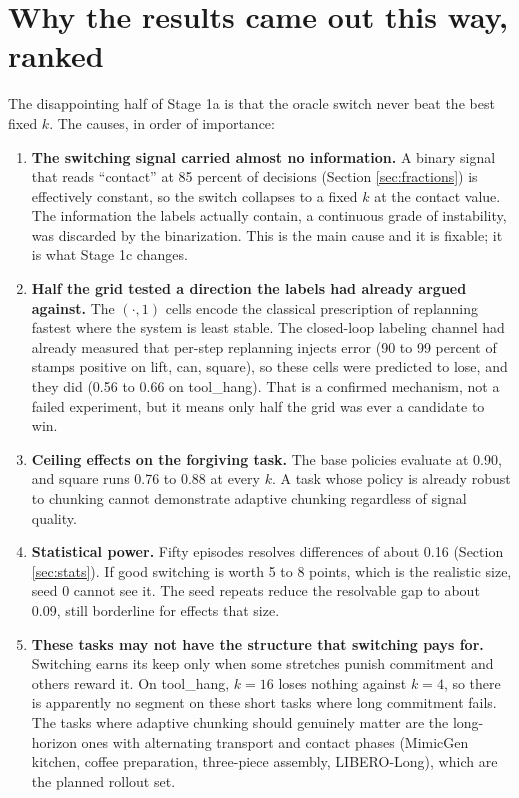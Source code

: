 \documentclass[11pt]{article}
\begin{document}
\section{Why the results came out this way, ranked}
\label{sec:why}

The disappointing half of Stage 1a is that the oracle switch never beat the best
fixed $k$. The causes, in order of importance:

\begin{enumerate}[leftmargin=1.6em]
\item \textbf{The switching signal carried almost no information.} A binary signal
that reads ``contact'' at 85 percent of decisions (Section \ref{sec:fractions}) is
effectively constant, so the switch collapses to a fixed $k$ at the contact value.
The information the labels actually contain, a continuous grade of instability, was
discarded by the binarization. This is the main cause and it is fixable; it is
what Stage 1c changes.
\item \textbf{Half the grid tested a direction the labels had already argued
against.} The $(\cdot,1)$ cells encode the classical prescription of replanning
fastest where the system is least stable. The closed-loop labeling channel had
already measured that per-step replanning injects error (90 to 99 percent of
stamps positive on lift, can, square), so these cells were predicted to lose, and
they did (0.56 to 0.66 on tool\_hang). That is a confirmed mechanism, not a failed
experiment, but it means only half the grid was ever a candidate to win.
\item \textbf{Ceiling effects on the forgiving task.} The base policies evaluate
at 0.90, and square runs 0.76 to 0.88 at every $k$. A task whose policy is already
robust to chunking cannot demonstrate adaptive chunking regardless of signal
quality.
\item \textbf{Statistical power.} Fifty episodes resolves differences of about
0.16 (Section \ref{sec:stats}). If good switching is worth 5 to 8 points, which is
the realistic size, seed 0 cannot see it. The seed repeats reduce the resolvable
gap to about 0.09, still borderline for effects that size.
\item \textbf{These tasks may not have the structure that switching pays for.}
Switching earns its keep only when some stretches punish commitment and others
reward it. On tool\_hang, $k{=}16$ loses nothing against $k{=}4$, so there is
apparently no segment on these short tasks where long commitment fails. The tasks
where adaptive chunking should genuinely matter are the long-horizon ones with
alternating transport and contact phases (MimicGen kitchen, coffee preparation,
three-piece assembly, LIBERO-Long), which are the planned rollout set.
\end{enumerate}
\end{document}
